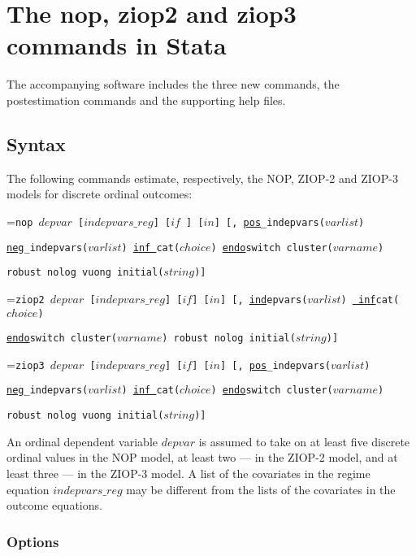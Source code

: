 \documentclass[letterpaper,fleqn,12pt]{article}
\begin{document}
\section{The nop, ziop2 and ziop3 commands in Stata}

The accompanying software includes the three new commands, the
postestimation commands and the supporting help files.

\subsection{Syntax}

The following commands estimate, respectively, the NOP, ZIOP-2 and ZIOP-3
models for discrete ordinal outcomes:

\medskip

\hangindent=\parindent\noindent \texttt{nop $depvar$ [$indepvars\_reg$] [$if$%
] [$in$] [, \underline{\texttt{pos}}\_indepvars($varlist$) }

\texttt{\underline{\texttt{neg}}\_indepvars($varlist$) \underline{\texttt{inf%
}}cat($choice$) }\underline{\texttt{endo}}\texttt{switch cluster($varname$) }

\texttt{robust nolog vuong initial($string$)] }

\hangindent=\parindent\noindent \texttt{ziop2 $depvar$ [$indepvars\_reg$] [$%
if$] [$in$] [, \underline{\texttt{ind}}epvars($varlist$) \underline{\texttt{%
inf}}cat($choice$)}

\texttt{\underline{\texttt{endo}}switch cluster($varname$) robust nolog
initial($string$)] }

\hangindent=\parindent\noindent \texttt{ziop3 $depvar$ [$indepvars\_reg$] [$%
if$] [$in$] [, \underline{\texttt{pos}}\_indepvars($varlist$)}

\texttt{\underline{\texttt{neg}}\_indepvars($varlist$) \underline{\texttt{inf%
}}cat($choice$) \underline{\texttt{endo}}switch cluster($varname$) }

\texttt{robust nolog vuong initial($string$)]}

\medskip

An ordinal dependent variable \texttt{$depvar$} is assumed to take on at
least five discrete ordinal values in the NOP model, at least two --- in the
ZIOP-2 model, and at least three --- in the ZIOP-3 model. A list of the
covariates in the regime equation \texttt{$indepvars\_reg$} may be different
from the lists of the covariates in the outcome equations.

\subsubsection*{Options}
\end{document}
